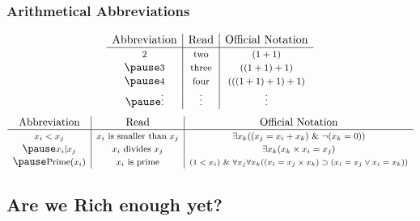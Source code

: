\begin{frame}
\frametitle{Arithmetical Abbreviations}


\[
\begin{array}{c|c|c}
\text{{Abbreviation}}  & \text{{Read}} & \text{{Official Notation}}     \\
\hline
\text{\footnotesize  $2$} & \text{\footnotesize two} & \text{\footnotesize $(1+1)$}   \\ \pause 
\text{\footnotesize  $3$} & \text{\footnotesize three} & \text{\footnotesize $((1+1) +1)$}  \\ \pause 
\text{\footnotesize $4$} & \text{\footnotesize four} & \text{\footnotesize $(((1+1) +1) + 1)$}   \\  \pause 
\text{\footnotesize \vdots} & \text{\footnotesize \vdots} & \text{\footnotesize \vdots} \\
\end{array}
\]
 \pause 
\[
\begin{array}{c|c|c}
 \text{{Abbreviation}}  &\text{{Read}} &\text{{Official Notation}}   \\
\hline
\text{\footnotesize $x_i < x_j$}  & \text{\footnotesize  $x_i$ is smaller than $x_j$}  & \text{\footnotesize  \(\exists x_k( (x_j = x_i + x_k) \ \& \ \neg(x_k = 0))\)}\\ \pause 
\text{\footnotesize $x_i |  x_j$}  & \text{\footnotesize  $x_i$ divides $x_j$}  & \text{\footnotesize  \(\exists x_k (x_k \times x_i = x_j)\)}\\ \pause 
\text{\footnotesize $\text{Prime}(x_i)$}  & \text{\footnotesize  $x_i$ is prime}  & \text{\scriptsize  \((1< x_i) \ \&\ \forall x_j\forall x_k((x_i = x_j\times x_k)\supset(x_i=x_j\vee x_i=x_k))\)}\\
\end{array}
\]

\end{frame}

\subsection{Are we Rich enough yet?}

